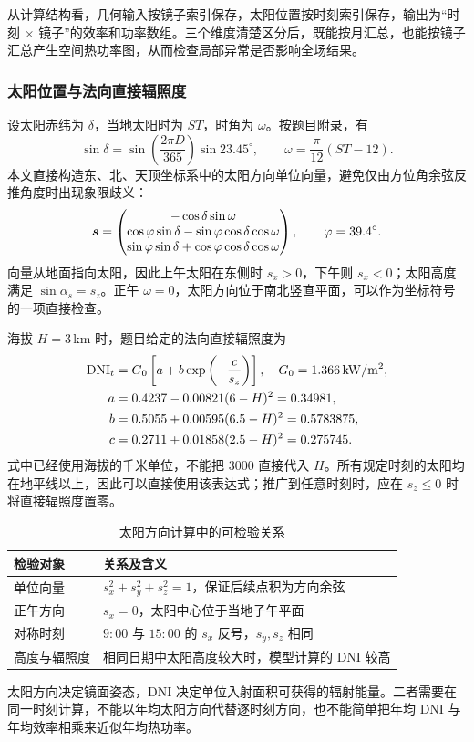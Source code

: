 从计算结构看，几何输入按镜子索引保存，太阳位置按时刻索引保存，输出为“时刻 $\times$ 镜子”的效率和功率数组。三个维度清楚区分后，既能按月汇总，也能按镜子汇总产生空间热功率图，从而检查局部异常是否影响全场结果。

\pagepart
\subsubsection{太阳位置与法向直接辐照度}
设太阳赤纬为 $\delta$，当地太阳时为 $ST$，时角为 $\omega$。按题目附录，有
\begin{equation}
\sin\delta=\sin\left(\frac{2\pi D}{365}\right)\sin23.45^\circ,
\qquad \omega=\frac{\pi}{12}(ST-12).
\end{equation}
本文直接构造东、北、天顶坐标系中的太阳方向单位向量，避免仅由方位角余弦反推角度时出现象限歧义：
\begin{equation}\label{eq:sun}
\bm{s}=\begin{pmatrix}
-\cos\delta\sin\omega\\
\cos\varphi\sin\delta-\sin\varphi\cos\delta\cos\omega\\
\sin\varphi\sin\delta+\cos\varphi\cos\delta\cos\omega
\end{pmatrix},\qquad \varphi=39.4^\circ.
\end{equation}
向量从地面指向太阳，因此上午太阳在东侧时 $s_x>0$，下午则 $s_x<0$；太阳高度满足 $\sin\alpha_s=s_z$。正午 $\omega=0$，太阳方向位于南北竖直平面，可以作为坐标符号的一项直接检查。

海拔 $H=3\,\mathrm{km}$ 时，题目给定的法向直接辐照度为
\begin{align}
\mathrm{DNI}_t&=G_0\left[a+b\exp\left(-\frac{c}{s_z}\right)\right],\quad G_0=1.366\,\mathrm{kW}/\mathrm{m}^2,\\
a&=0.4237-0.00821(6-H)^2=0.34981,\\
b&=0.5055+0.00595(6.5-H)^2=0.5783875,\\
c&=0.2711+0.01858(2.5-H)^2=0.275745.
\end{align}
式中已经使用海拔的千米单位，不能把 $3000$ 直接代入 $H$。所有规定时刻的太阳均在地平线以上，因此可以直接使用该表达式；推广到任意时刻时，应在 $s_z\le0$ 时将直接辐照度置零。

\begin{table}[H]\centering\small
\caption{太阳方向计算中的可检验关系}
\begin{tabular}{p{48mm}p{95mm}}\toprule
检验对象 & 关系及含义\\\midrule
单位向量 & $s_x^2+s_y^2+s_z^2=1$，保证后续点积为方向余弦\\
正午方向 & $s_x=0$，太阳中心位于当地子午平面\\
对称时刻 & $9{:}00$ 与 $15{:}00$ 的 $s_x$ 反号，$s_y,s_z$ 相同\\
高度与辐照度 & 相同日期中太阳高度较大时，模型计算的 DNI 较高\\
\bottomrule\end{tabular}\end{table}
太阳方向决定镜面姿态，DNI 决定单位入射面积可获得的辐射能量。二者需要在同一时刻计算，不能以年均太阳方向代替逐时刻方向，也不能简单把年均 DNI 与年均效率相乘来近似年均热功率。

